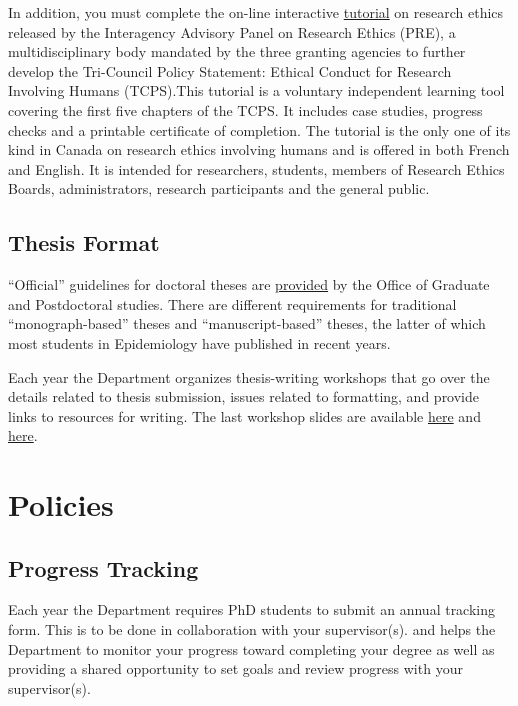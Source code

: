 \documentclass[
]{book}
\begin{document}
In addition, you must complete the on-line interactive \href{http://www.pre.ethics.gc.ca/eng/education/tutorial-didacticiel/}{tutorial} on research ethics released by the Interagency Advisory Panel on Research Ethics (PRE), a multidisciplinary body mandated by the three granting agencies to further develop the Tri-Council Policy Statement: Ethical Conduct for Research Involving Humans (TCPS).This tutorial is a voluntary independent learning tool covering the first five chapters of the TCPS. It includes case studies, progress checks and a printable certificate of completion. The tutorial is the only one of its kind in Canada on research ethics involving humans and is offered in both French and English. It is intended for researchers, students, members of Research Ethics Boards, administrators, research participants and the general public.

\hypertarget{thesis-format}{%
\section{Thesis Format}\label{thesis-format}}

``Official'' guidelines for doctoral theses are \href{https://www.mcgill.ca/gps/thesis/thesis-guidelines/preparation}{provided} by the Office of Graduate and Postdoctoral studies. There are different requirements for traditional ``monograph-based'' theses and ``manuscript-based'' theses, the latter of which most students in Epidemiology have published in recent years.

Each year the Department organizes thesis-writing workshops that go over the details related to thesis submission, issues related to formatting, and provide links to resources for writing. The last workshop slides are available \href{docs/PhD_Epi_Thesis_Writing_Workshop_5Feb2021_KHayden.pptx}{here} and \href{docs/thesis-workshop-PhD-2021-02-05.pdf}{here}.

\hypertarget{policies}{%
\chapter{Policies}\label{policies}}

\hypertarget{progress-tracking}{%
\section{Progress Tracking}\label{progress-tracking}}

Each year the Department requires PhD students to submit an annual tracking form. This is to be done in collaboration with your supervisor(s). and helps the Department to monitor your progress toward completing your degree as well as providing a shared opportunity to set goals and review progress with your supervisor(s).
\end{document}
